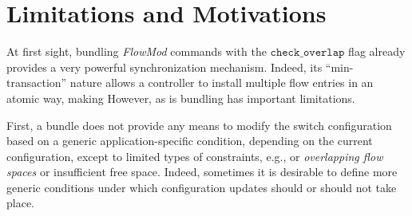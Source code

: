 \documentclass[conference]{sigcomm-alternate}
\newcommand{\checko}{\texttt{check\_overlap}\xspace}
\newcommand{\stefan}[1]{\textit{\textcolor{red}{[stefan]: #1}}} %
\newcommand{\liron}[1]{\textit{\textcolor{mygreen}{[liron]: #1}}} %
\newcommand{\petr}[1]{\textit{\textcolor{blue}{[petr]: #1}}} %
\begin{document}




\section{Limitations and Motivations}\label{sec:motivation} 


At first sight, bundling \emph{FlowMod} commands with  the $\checko$
flag already provides a very powerful synchronization mechanism.
Indeed, its ``min-transaction'' nature allows a controller 
to install multiple flow entries in an atomic way, making
However, as is 
bundling has important limitations.

First, %
a bundle does not provide any means to modify the switch configuration 
based on a generic application-specific condition, depending on the
current configuration, except to limited types of constraints, e.g.,
or \emph{overlapping flow spaces} or insufficient free space.
Indeed, sometimes it is desirable to  define more generic conditions
under which configuration updates should or should not take place.   

 
\end{document}
